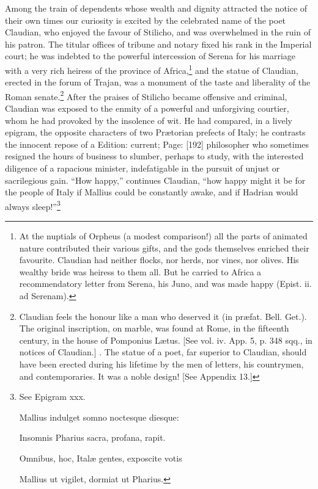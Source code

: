 Among the train of dependents whose wealth and dignity attracted the notice of their own times our curiosity is excited by the celebrated name of the poet Claudian, who enjoyed the favour of Stilicho, and was overwhelmed in the ruin of his patron. The titular offices of tribune and notary fixed his rank in the Imperial court; he was indebted to the powerful intercession of Serena for his marriage with a very rich heiress of the province of Africa,\footnote{At the nuptials of Orpheus (a modest comparison!) all the parts of animated nature contributed their various gifts, and the gods themselves enriched their favourite. Claudian had neither flocks, nor herds, nor vines, nor olives. His wealthy bride was heiress to them all. But he carried to Africa a recommendatory letter from Serena, his Juno, and was made happy (Epist. ii. ad Serenam).} and the statue of Claudian, erected in the forum of Trajan, was a monument of the taste and liberality of the Roman senate.\footnote{Claudian feels the honour like a man who deserved it (in præfat. Bell. Get.). The original inscription, on marble, was found at Rome, in the fifteenth century, in the house of Pomponius Lætus. [See vol. iv. App. 5, p. 348 sqq., in notices of Claudian.] . The statue of a poet, far superior to Claudian, should have been erected during his lifetime by the men of letters, his countrymen, and contemporaries. It was a noble design! [See Appendix 13.]} After the praises of Stilicho became offensive and criminal, Claudian was exposed to the enmity of a powerful and unforgiving courtier, whom he had provoked by the insolence of wit. He had compared, in a lively epigram, the opposite characters of two Prætorian prefects of Italy; he contrasts the innocent repose of a Edition: current; Page: [192] philosopher who sometimes resigned the hours of business to slumber, perhaps to study, with the interested diligence of a rapacious minister, indefatigable in the pursuit of unjust or sacrilegious gain. \texthebrew{“}How happy,\texthebrew{}” continues Claudian, \texthebrew{“}how happy might it be for the people of Italy if Mallius could be constantly awake, and if Hadrian would always sleep!\texthebrew{}”\footnote{See Epigram xxx.

Mallius indulget somno noctesque diesque:

Insomnis Pharius sacra, profana, rapit.

Omnibus, hoc, Italæ gentes, exposcite votis

Mallius ut vigilet, dormiat ut Pharius.

}
